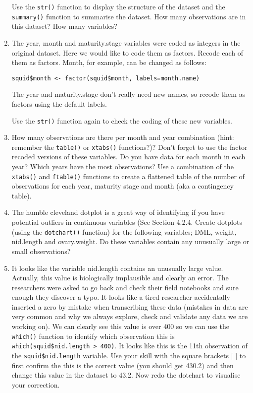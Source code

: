\documentclass[12pt]{article}
\newcommand{\lst}[1]{\lstinline{#1}}
\begin{document}
\begin{enumerate}
  Use the \lst{str()} function to display the structure of the dataset and the \lst{summary()} function to summarise the dataset. How many observations are in this dataset? How many variables? 
  
\item
The  year, month and maturity.stage variables were coded as integers in the original dataset. Here we would like to code them as factors. Recode each of them as factors.  Month, for example, can be changed as follows:
\begin{lstlisting}
squid$month <- factor(squid$month, labels=month.name)
\end{lstlisting}

The year and maturity.stage don't really need new names, so recode them as factors
using the default labels.

Use the \lst{str()} function again to check the coding of these new variables.

 
\item How many observations are there per month and year combination (hint: remember the
{\tt table()} or {\tt xtabs()} functions?)? Don’t forget to use the factor recoded versions of these variables. Do you have data for each month in each year? Which years have the most observations?  Use a combination of the {\tt xtabs()} and {\tt ftable()} functions to create a flattened table of the number of observations for each year, maturity stage and month (aka a contingency table).


 
\item The humble cleveland dotplot is a great way of identifying if you have potential outliers in continuous variables (See Section 4.2.4. Create dotplots (using the \lst{dotchart()} function) for the following variables; DML, weight, nid.length and ovary.weight. Do these variables contain any unusually large or small observations?

 
\item It looks like the variable nid.length contains an unusually large value. Actually, this value is biologically implausible and clearly an error. The researchers were asked to go back and check their field notebooks and sure enough they discover a typo. It looks like a tired researcher accidentally inserted a zero by mistake when transcribing these data (mistakes in data are very common and why we always explore, check and validate any data we are working on). We can clearly see this value is over 400 so we can use the \lst{which()} function to identify which observation this is \lst{which(squid$nid.length > 400)}.
 It looks like this is the 11th observation of the \lst{squid$nid.length} variable. Use your skill with the square brackets [ ] to first confirm the this is the correct value (you should get 430.2) and then change this value in the dataset to 43.2. Now redo the dotchart to visualise your correction.
 

\end{enumerate}
\end{document}
